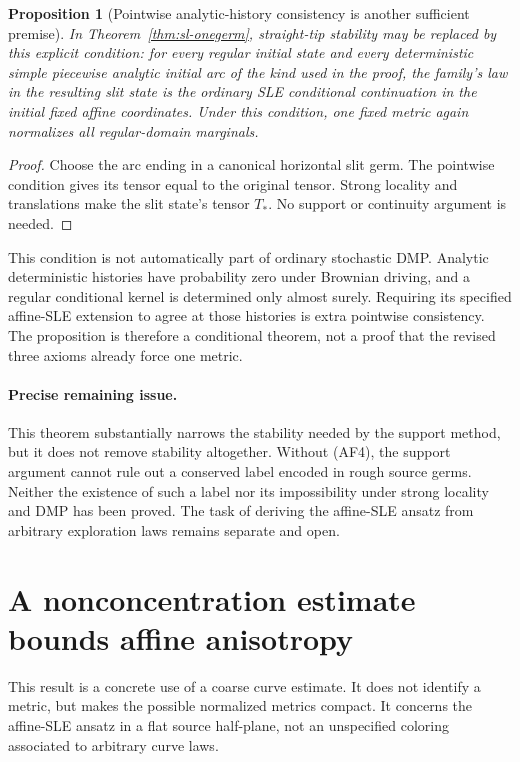 \documentclass[11pt]{article}
\newtheorem{proposition}[theorem]{Proposition}
\theoremstyle{definition}\newtheorem{definition}[theorem]{Definition}
\theoremstyle{remark}\newtheorem{remark}[theorem]{Remark}
\begin{document}
\begin{proposition}[Pointwise analytic-history consistency is another sufficient premise]
\label{prop:sl-pointwisehistories}
In Theorem~\ref{thm:sl-onegerm}, straight-tip stability may be replaced by
this explicit condition: for every regular initial state and every deterministic
simple piecewise analytic initial arc of the kind used in the proof, the
family's law in the resulting slit state is the ordinary SLE conditional
continuation in the initial fixed affine coordinates. Under this condition,
one fixed metric again normalizes all regular-domain marginals.
\end{proposition}
\begin{proof}
Choose the arc ending in a canonical horizontal slit germ. The pointwise
condition gives its tensor equal to the original tensor. Strong locality
and translations make the slit state's tensor $T_*$. No support or continuity
argument is needed.
\end{proof}

This condition is not automatically part of ordinary stochastic DMP. Analytic
deterministic histories have probability zero under Brownian driving, and a
regular conditional kernel is determined only almost surely. Requiring its
specified affine-SLE extension to agree at those histories is extra pointwise
consistency. The proposition is therefore a conditional theorem, not a proof
that the revised three axioms already force one metric.

\paragraph{Precise remaining issue.}
This theorem substantially narrows the stability needed by the support method,
but it does not remove stability altogether. Without (AF4), the support argument
cannot rule out a conserved label encoded in rough source germs. Neither the
existence of such a label nor its impossibility under strong locality and DMP
has been proved. The task of deriving the affine-SLE ansatz from arbitrary
exploration laws remains separate and open.

\section{A nonconcentration estimate bounds affine anisotropy}
\label{sec:rsw-metric-compactness}

This result is a concrete use of a coarse curve estimate. It does not
identify a metric, but makes the possible normalized metrics compact.
It concerns the affine-SLE ansatz in a flat source half-plane, not an
unspecified coloring associated to arbitrary curve laws.
\end{document}
